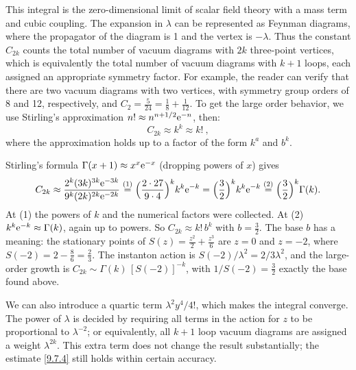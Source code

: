 This integral is the zero-dimensional limit of scalar field theory with a mass term and cubic coupling. The expansion in $\lambda$ can be represented as Feynman diagrams, where the propagator of the diagram is 1 and the vertex is $-\lambda$. 
Thus the constant $C_{2 k}$ counts the total number of vacuum diagrams with $2k$ three-point vertices, which is equivalently the total number of vacuum diagrams with $k+1$ loops, each assigned an appropriate symmetry factor.
For example, the reader can verify that there are two vacuum diagrams with two vertices, with symmetry group orders of 8 and 12, respectively, and $C_{2}=\frac{5}{24}=\frac{1}{8}+\frac{1}{12}$. 
To get the large order behavior, we use Stirling's approximation $n ! \approx n^{n+1 / 2} \mathrm{e}^{-n}$, then:
\begin{equation}
	C_{2 k} \approx k^{k} \approx k !
	\:, \label{9.7.4}
\end{equation}
where the approximation holds up to a factor of the form $k^{a}$ and $b^{k}$.
\begin{tcolorbox}[breakable]
	\begin{remark}
		Stirling's formula $\Gamma(x+1)\approx x^x\mathrm{e}^{-x}$ (dropping powers of $x$) gives
		\begin{equation*}
			C_{2k}\approx\frac{2^k(3k)^{3k}\mathrm{e}^{-3k}}{9^k(2k)^{2k}\mathrm{e}^{-2k}}\overset{(1)}{=}\Bigl(\frac{2\cdot27}{9\cdot4}\Bigr)^kk^k\mathrm{e}^{-k}=\Bigl(\frac32\Bigr)^kk^k\mathrm{e}^{-k}\overset{(2)}{=}\Bigl(\frac32\Bigr)^k\Gamma(k) .
		\end{equation*}
		At (1) the powers of $k$ and the numerical factors were collected. At (2) $k^k\mathrm{e}^{-k}\approx\Gamma(k)$, again up to powers. So $C_{2k}\approx k!\,b^k$ with $b=\frac32$. The base $b$ has a meaning: the stationary points of $S(z)=\frac{z^2}{2}+\frac{z^3}{6}$ are $z=0$ and $z=-2$, where $S(-2)=2-\frac86=\frac23$. The instanton action is $S(-2)/\lambda^2=2/3\lambda^2$, and the large-order growth is $C_{2k}\sim\Gamma(k)\,[S(-2)]^{-k}$, with $1/S(-2)=\frac32$ exactly the base found above.
	\end{remark}
\end{tcolorbox}

We can also introduce a quartic term $\lambda^{2} y^{4} / 4 !$, which makes the integral converge. The power of $\lambda$ is decided by requiring all terms in the action for $z$ to be proportional to $\lambda^{-2}$; 
or equivalently, all $k+1$ loop vacuum diagrams are assigned a weight $\lambda^{2k}$.
This extra term does not change the result substantially; the estimate \eqref{9.7.4} still holds within certain accuracy.

